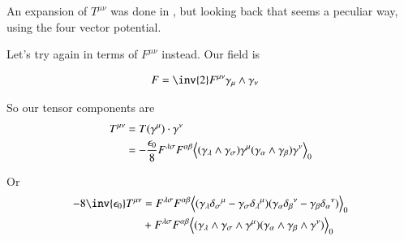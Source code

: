 An expansion of $T^{\mu\nu}$ was done in , but looking
back that seems a peculiar way, using the four vector potential.

Let's try again in terms of $F^{\mu\nu}$ instead.  Our field is

\begin{align}
F 
&= \inv{2} F^{\mu\nu} \gamma_{\mu} \wedge \gamma_\nu 
\end{align}

So our tensor components are
\begin{align*}
T^{\mu\nu}
&= T(\gamma^\mu) \cdot \gamma^\nu \\
&= -\frac{\epsilon_0}{8} F^{\lambda\sigma} F^{\alpha\beta} 
{\left\langle{{ (\gamma_\lambda \wedge \gamma_\sigma) \gamma^\mu (\gamma_\alpha \wedge \gamma_\beta) \gamma^\nu }}\right\rangle}_{0} \\
\end{align*}

Or
\begin{align*}
-8{\inv{\epsilon_0}} T^{\mu\nu}
&= 
F^{\lambda\sigma} F^{\alpha\beta} 
\gpgradezero{ 
(\gamma_\lambda {\delta_\sigma}^\mu 
-\gamma_\sigma {\delta_\lambda}^\mu)
(\gamma_\alpha {\delta_\beta}^\nu 
-\gamma_\beta {\delta_\alpha}^\nu)
} \\
&+
F^{\lambda\sigma} F^{\alpha\beta} 
\gpgradezero{ (\gamma_\lambda \wedge \gamma_\sigma \wedge \gamma^\mu) (\gamma_\alpha \wedge \gamma_\beta \wedge \gamma^\nu) } \\
\end{align*}

